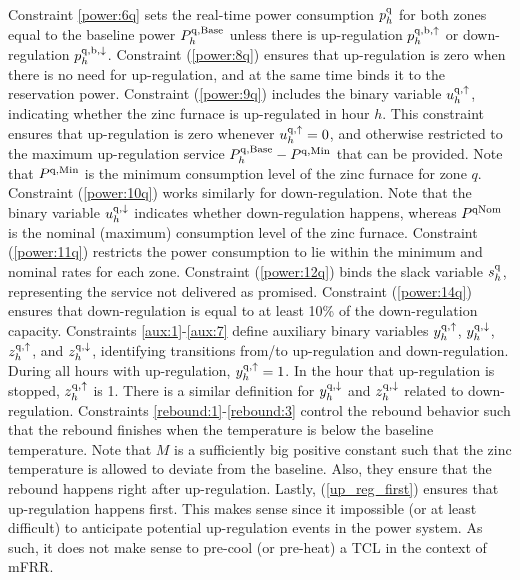 \documentclass[conference]{IEEEtran}
\begin{document}
%
Constraint \eqref{power:6q} sets the real-time power consumption $p_{h}^{\rm{q}}$ for both zones equal to the baseline power $P^{\rm{q},\rm{Base}}_{h}$ unless there is up-regulation $p^{\rm{q},\rm{b}, \uparrow}_{h}$ or down-regulation $p^{\rm{q},\rm{b}, \downarrow}_{h}$.
%
%
Constraint (\ref{power:8q}) ensures that up-regulation is zero when there is no need for up-regulation, and at the same time binds it to the reservation power.
%
Constraint (\ref{power:9q}) includes the binary variable $u^{\rm{q},\uparrow}_{h}$, indicating whether the zinc furnace is up-regulated in hour $h$. This constraint ensures that up-regulation is zero whenever $u^{\rm{q},\uparrow}_{h} = 0$, and otherwise restricted to the maximum up-regulation service $P^{\rm{q},\rm{Base}}_{h}-P^{\rm{q},\rm{Min}}$ that can be provided. Note that $P^{\rm{q},\rm{Min}}$ is the minimum consumption level of the zinc furnace for zone $q$.
%
Constraint (\ref{power:10q}) works similarly for down-regulation. Note that the binary variable $u^{\rm{q},\downarrow}_{h}$ indicates whether down-regulation happens, whereas $P^{\rm{q}\rm{Nom}}$ is the nominal (maximum) consumption level of the zinc furnace.
%
Constraint (\ref{power:11q}) restricts the power consumption to lie within the minimum and nominal rates for each zone.
%
Constraint (\ref{power:12q}) binds the slack variable $s_{h}^{\rm{q}}$, representing the service not delivered as promised.
%
Constraint (\ref{power:14q}) ensures that down-regulation is equal to at least 10\% of the down-regulation capacity.
%
%
Constraints \eqref{aux:1}-\eqref{aux:7} define auxiliary binary variables $y^{\rm{q},\uparrow}_{h}$, $y^{\rm{q},\downarrow}_{h}$, $z^{\rm{q},\uparrow}_{h}$, and $z^{\rm{q},\downarrow}_{h}$, identifying transitions from/to up-regulation and down-regulation.
During all hours with up-regulation, $y^{\rm{q},\uparrow}_{h}=1$. In the hour that up-regulation is stopped, $z^{\rm{q},\uparrow}_{h}$ is 1. There is a similar definition for $y^{\rm{q},\downarrow}_{h}$ and $z^{\rm{q},\downarrow}_{h}$ related to down-regulation.
%
%
Constraints \eqref{rebound:1}-\eqref{rebound:3} control the rebound behavior such that the rebound finishes when the temperature is below the baseline temperature. Note that $M$ is a sufficiently big positive constant such that the zinc temperature is allowed to deviate from the baseline. Also, they ensure that the rebound happens right after up-regulation.
%
Lastly, (\ref{up_reg_first}) ensures that up-regulation happens first. This makes sense since it impossible (or at least difficult) to anticipate potential up-regulation events in the power system. As such, it does not make sense to pre-cool (or pre-heat) a TCL in the context of mFRR.

\vfill
\end{document}
